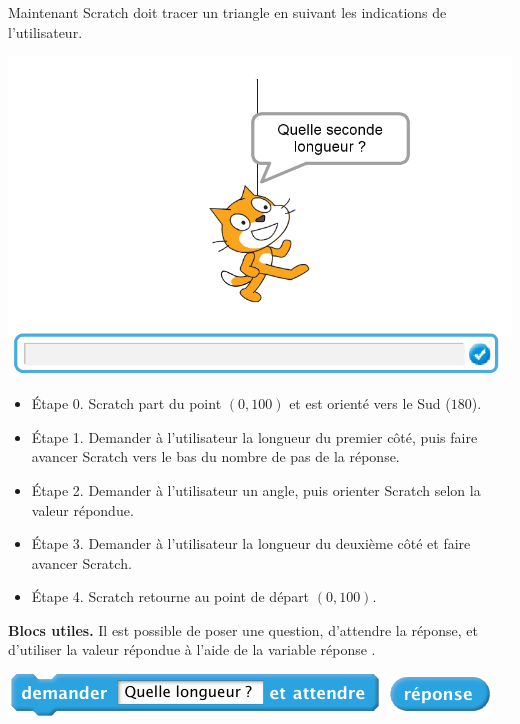 \documentclass[class=report,crop=false, 12pt]{standalone}
\begin{document}
\begin{activite}

Maintenant Scratch doit tracer un triangle en suivant les indications de l'utilisateur.

\begin{center}
  \includegraphics[scale=\scaleecran]{ecran-05-ex2} 
\end{center}




\begin{itemize}
  \item \'Etape 0. Scratch part du point $(0,100)$ et est orienté vers le Sud ($180$\textdegree).
  
  \item \'Etape 1. Demander à l'utilisateur la longueur du premier côté, puis faire avancer Scratch vers le bas du nombre de pas de la réponse.
  
  \item \'Etape 2. Demander à l'utilisateur un angle, puis orienter Scratch selon la valeur répondue.
   
  \item \'Etape 3. Demander à l'utilisateur la longueur du deuxième côté et faire avancer Scratch.
  
  \item \'Etape 4. Scratch retourne au point de départ $(0,100)$.
\end{itemize}

\bigskip

\textbf{Blocs utiles.}
Il est possible de poser une question, d'attendre la réponse, et d'utiliser la valeur répondue à l'aide de la variable \og réponse \fg{}.

\begin{center}
  \includegraphics[scale=\scalebloc]{bloc-05-ex2a}
  \qquad\qquad\qquad
  \includegraphics[scale=\scalebloc]{bloc-05-ex2b}
\end{center}

\end{activite}
\end{document}
